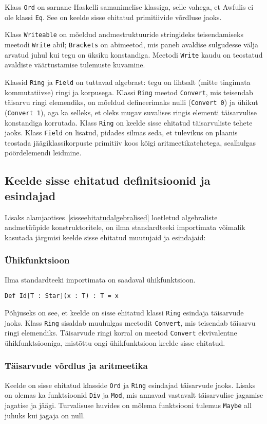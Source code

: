 \documentclass[12pt]{article}
\begin{document}
        Klass \verb!Ord! on sarnane Haskelli samanimelise klassiga, selle vahega, et Awfulis ei ole klassi \verb!Eq!. See on keelde sisse ehitatud primitiivide võrdluse jaoks.

        Klass \verb!Writeable! on mõeldud andmestruktuuride stringideks teisendamiseks meetodi \verb!Write! abil; \verb!Brackets! on abimeetod, mis paneb avaldise sulgudesse välja arvatud juhul kui tegu on üksiku konstandiga. Meetodi \verb!Write! kaudu on teostatud avaldiste väärtustamise tulemuste kuvamine.

        Klassid \verb!Ring! ja \verb!Field! on tuttavad algebrast: tegu on lihtsalt (mitte tingimata kommutatiivse) ringi ja korpusega. Klassi \verb!Ring! meetod \verb!Convert!, mis teisendab täisarvu ringi elemendiks, on mõeldud defineerimaks nulli (\verb!Convert 0!) ja ühikut (\verb!Convert 1!), aga ka selleks, et oleks mugav suvalises ringis elementi täisarvulise konstandiga korrutada. Klass \verb!Ring! on keelde sisse ehitatud täisarvuliste tehete jaoks. Klass \verb!Field! on lisatud, pidades silmas seda, et tulevikus on plaanis teostada jäägiklassikorpuste primitiiv koos kõigi aritmeetikatehetega, sealhulgas pöördelemendi leidmine.
    \subsection{Keelde sisse ehitatud definitsioonid ja esindajad}
      Lisaks alamjaotises~\ref{sisseehitatudalgebralised} loetletud algebraliste andmetüüpide konstruktoritele, on ilma standardteeki importimata võimalik kasutada järgmisi keelde sisse ehitatud muutujaid ja esindajaid:
      \subsubsection{Ühikfunktsioon}
        Ilma standardteeki importimata on saadaval ühikfunktsioon.

        \begin{verbatim}Def Id[T : Star](x : T) : T = x\end{verbatim}

        Põhjuseks on see, et keelde on sisse ehitatud klassi \verb!Ring! esindaja täisarvude jaoks. Klass \verb!Ring! sisaldab muuhulgas meetodit \verb!Convert!, mis teisendab täisarvu ringi elemendiks. Täisarvude ringi korral on meetod \verb!Convert! ekvivalentne ühikfunktsiooniga, mistõttu ongi ühikfunktsioon keelde sisse ehitatud.
      \subsubsection{Täisarvude võrdlus ja aritmeetika}
        Keelde on sisse ehitatud klasside \verb!Ord! ja \verb!Ring! esindajad täisarvude jaoks. Lisaks on olemas ka funktsioonid \verb!Div! ja \verb!Mod!, mis annavad vastavalt täisarvulise jagamise jagatise ja jäägi. Turvalisuse huvides on mõlema funktsiooni tulemus \verb!Maybe! all juhuks kui jagaja on null.
\end{document}
